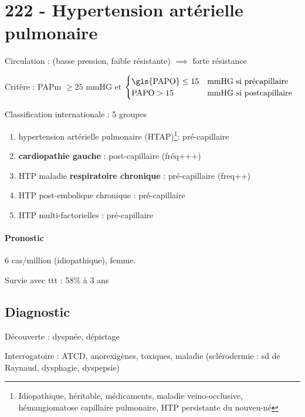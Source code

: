 \section{222 - Hypertension artérielle pulmonaire}%
\label{sec:hypertension_arterielle_pulmonaire}

Circulation : (basse pression, faible résistante) $\implies$ forte résistance

Critère : \gls{PAPm} $\ge 25$ mmHG et
$\begin{cases}
  \text{\gls{PAPO}} \le 15 & \text{mmHG si précapillaire} \\
  \text{PAPO} > 15 & \text{mmHG si postcapillaire}
  \end{cases}  $

Classification internationale : 5 groupes
\begin{enumerate}
\item hypertension artérielle pulmonaire (HTAP)\footnote{Idiopathique,
    héritable, médicaments, maladie veino-occlusive, hémangiomatose capillaire
    pulmonaire, HTP persistante du nouveu-né}: pré-capillaire
\item \textbf{cardiopathie gauche}  : post-capillaire (fréq+++)
\item HTP maladie \textbf{respiratoire chronique}  : pré-capillaire (freq++)
\item HTP post-embolique chronique : pré-capillaire
\item HTP multi-factorielles : pré-capillaire
\end{enumerate}

\paragraph{Pronostic}
6 cas/million (idiopathique), femme.

Survie avec ttt : 58\% à 3 ans

\subsection{Diagnostic}
Découverte : dyspnée, dépistage

Interrogatoire : ATCD, anorexigènes, toxiques, maladie (sclérodermie : sd de
Raynaud, dysphagie, dyspepsie)


